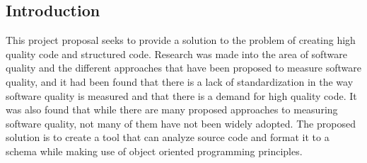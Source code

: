 \subsection{Introduction} %
This project proposal seeks to provide a solution to the problem of creating high quality code and structured code. Research was made into the area of software quality and the different approaches that have been proposed to measure software quality, and it had been found that there is a lack of standardization in the way software quality is measured and that there is a demand for high quality code. It was also found that while there are many proposed approaches to measuring software quality, not many of them have not been widely adopted. The proposed solution is to create a tool that can analyze source code and format it to a schema while making use of object oriented programming principles.